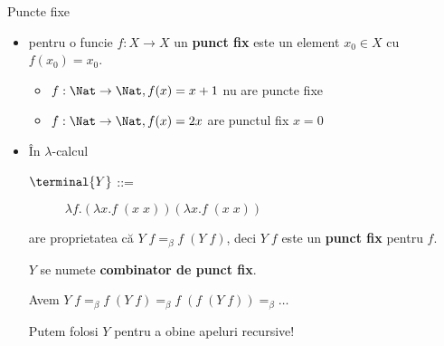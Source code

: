 \documentclass[xcolor=pdftex,romanian,colorlinks]{beamer}
\begin{document}
\begin{frame}[fragile]{Puncte fixe}

\begin{itemize}
\item pentru o func\ts ie $f:X\to X$ un {\bf punct fix} este un element $x_0\in X$ cu $f(x_0)=x_0$.


\begin{itemize}
\item $f:\Nat\to\Nat, f(x)=x+1$ nu are puncte fixe
\item $f:\Nat\to\Nat, f(x)=2x$ are punctul fix $x=0$
\end{itemize} 

\pause

\item \^{I}n $\lambda$-calcul  
  \begin{description}
    \item[$\terminal{Y}$ ::= ] $\lambda f. (\lambda x. f\; (x\; x))(\lambda x. f\; (x\; x))$
\end{description}
    
are proprietatea c\u a $Y\; f =_\beta f\; (Y\; f)$, deci $Y\; f$ este un {\bf punct fix} pentru $f$.     
    \pause

\medskip

$Y$ se nume\sh te {\bf combinator de punct fix}. \pause\medskip


Avem $Y\; f =_\beta f\; (Y\; f) =_\beta f\; (f\; (Y\; f)) =_\beta \ldots$

\medskip
Putem folosi $Y$ pentru a ob\ts ine apeluri recursive!
\end{itemize}
\end{frame}
\end{document}
